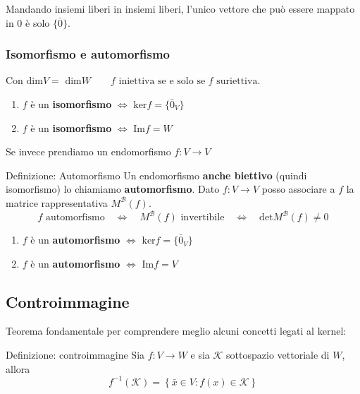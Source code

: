 \documentclass[x11names]{article}
\begin{document}
\noindent
Mandando insiemi liberi in insiemi liberi, l'unico vettore che può essere mappato in $0$ è solo $\{\bar{0}\}$. 

\subsubsection{Isomorfismo e automorfismo}

Con $\text{dim}V = \text{ dim}W \qquad f \text{ iniettiva se e solo se } f \text{ suriettiva}.$

\begin{enumerate}
	\item $f$ è un \textbf{isomorfismo} $\Longleftrightarrow$ $\text{ker}f = \{\bar{0}_{V}\}$
	\item $f$ è un \textbf{isomorfismo} $\Longleftrightarrow$ $\text{Im}f = W$
\end{enumerate}

Se invece prendiamo un endomorfismo $f: V \to V$
\begin{center}
	\colorbox{myblue}{\begin{minipage}{5.75in}
			\begin{blues}{Definizione: Automorfismo}
				Un endomorfismo \textbf{anche biettivo} (quindi isomorfismo) lo chiamiamo \textbf{automorfismo}. Dato $f: V \rightarrow V$ posso associare a  $f$ la matrice rappresentativa $M^\mathscr{B}\left(f\right)$.
				\[
				f \text{ automorfismo} \quad \Longleftrightarrow \quad  M^\mathscr{B}\left(f\right) \text{ invertibile} \quad \Longleftrightarrow \quad \text{det}M^{\mathscr{B}}\left(f\right) \neq 0
				\] 
			\end{blues}
	\end{minipage}}        
\end{center}

\begin{enumerate}
	\item $f$ è un \textbf{automorfismo} $\Longleftrightarrow$ $\text{ker}f = \{\bar{0}_{V}\}$
	\item $f$ è un \textbf{automorfismo} $\Longleftrightarrow$ $\text{Im}f = V$
\end{enumerate}

\subsection{Controimmagine}
Teorema fondamentale per comprendere meglio alcuni concetti legati al kernel:
\begin{center}
	\colorbox{myblue}{\begin{minipage}{5.75in}
			\begin{blues}{Definizione: controimmagine}
				Sia $f:V\to W$ e sia $\mathcal{K}$ sottospazio vettoriale di $W$, allora
				\[
				f^{-1}(\mathcal{K}) = \left\{\bar{x} \in V : f(x) \in \mathcal{K}\right\}
				\]
			\end{blues}
	\end{minipage}}        
\end{center}
\end{document}
